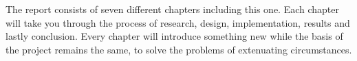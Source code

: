 \documentclass[../main.tex]{subfiles}
\begin{document}
\raggedright
The report consists of seven different chapters including this one.
Each chapter will take you through the process of research, design, implementation, results and lastly conclusion. Every chapter will introduce something new while the basis of the project remains the same, to solve the problems of extenuating circumstances.
\end{document}
